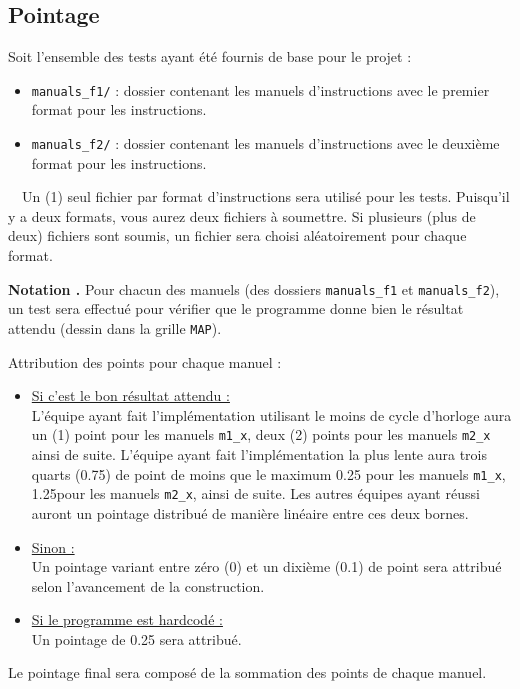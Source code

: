 \subsection*{Pointage}
\noindent
Soit l'ensemble des tests ayant été fournis de base pour le projet :
\begin{itemize}
  \item \texttt{manuals\_f1/} : dossier contenant les manuels 
    d'instructions avec le premier format pour les instructions.
  \item \texttt{manuals\_f2/} : dossier contenant les manuels 
    d'instructions avec le deuxième format pour les instructions.
\end{itemize}
\faExclamationCircle\ \ Un (1) seul fichier par format d'instructions
sera utilisé pour les tests. Puisqu'il y a deux formats, vous aurez
deux fichiers à soumettre. Si plusieurs (plus de deux) fichiers sont 
soumis, un fichier sera choisi aléatoirement pour chaque format.
\medskip

\noindent
\textbf{Notation .} \quad
Pour chacun des manuels (des dossiers \texttt{manuals\_f1} et 
\texttt{manuals\_f2}), un test sera effectué pour vérifier que le 
programme donne bien le résultat attendu (dessin dans la grille 
\texttt{MAP}). 

\noindent
Attribution des points pour chaque manuel :
\begin{itemize}
  \item \underline{Si c'est le bon résultat attendu :} \\
    L'équipe ayant fait l'implémentation utilisant le moins de cycle
    d'horloge aura un (1) point pour les manuels \texttt{m1\_x}, 
    deux (2) points pour les manuels \texttt{m2\_x} ainsi de suite. 
    L'équipe ayant fait l'implémentation la plus lente aura trois 
    quarts (0.75) de point de moins que le maximum 0.25 pour les 
    manuels \texttt{m1\_x}, 1.25pour les manuels \texttt{m2\_x}, ainsi 
    de suite. Les autres équipes ayant réussi auront un pointage 
    distribué de manière linéaire entre ces deux bornes.
  \item \underline{Sinon :} \\
    Un pointage variant entre zéro (0) et un dixième (0.1) de point 
    sera attribué selon l'avancement de la construction.
  \item \underline{Si le programme est hardcodé :} \\
    Un pointage de 0.25 sera attribué.
\end{itemize}

\noindent
Le pointage final sera composé de la sommation des points de chaque 
manuel.
